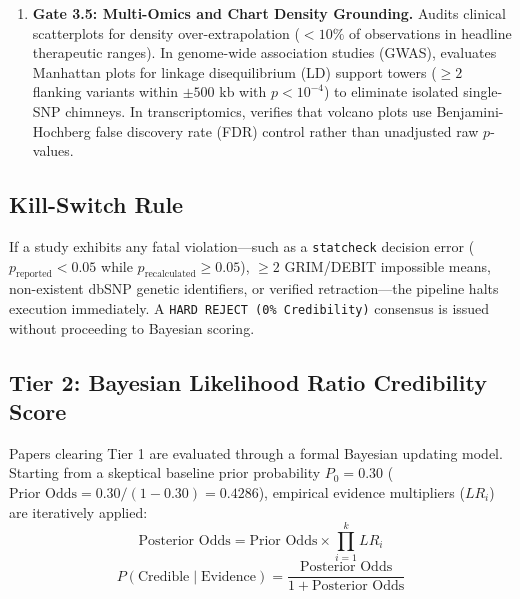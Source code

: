 \documentclass[11pt,a4paper]{article}
\begin{document}
\begin{enumerate}
    \item \textbf{Gate 3.5: Multi-Omics and Chart Density Grounding.}
    Audits clinical scatterplots for density over-extrapolation ($<10\%$ of observations in headline therapeutic ranges). In genome-wide association studies (GWAS), evaluates Manhattan plots for linkage disequilibrium (LD) support towers ($\ge 2$ flanking variants within $\pm 500$ kb with $p < 10^{-4}$) to eliminate isolated single-SNP chimneys. In transcriptomics, verifies that volcano plots use Benjamini-Hochberg false discovery rate (FDR) control rather than unadjusted raw $p$-values.
\end{enumerate}

\subsection{Kill-Switch Rule}
If a study exhibits any fatal violation—such as a \texttt{statcheck} decision error ($p_{\text{reported}} < 0.05$ while $p_{\text{recalculated}} \ge 0.05$), $\ge 2$ GRIM/DEBIT impossible means, non-existent dbSNP genetic identifiers, or verified retraction—the pipeline halts execution immediately. A \texttt{HARD REJECT (0\% Credibility)} consensus is issued without proceeding to Bayesian scoring.

\subsection{Tier 2: Bayesian Likelihood Ratio Credibility Score}
Papers clearing Tier 1 are evaluated through a formal Bayesian updating model. Starting from a skeptical baseline prior probability $P_0 = 0.30$ ($\text{Prior Odds} = 0.30 / (1 - 0.30) = 0.4286$), empirical evidence multipliers ($LR_i$) are iteratively applied:
\begin{equation}
    \text{Posterior Odds} = \text{Prior Odds} \times \prod_{i=1}^{k} LR_i
\end{equation}
\begin{equation}
    P(\text{Credible} \mid \text{Evidence}) = \frac{\text{Posterior Odds}}{1 + \text{Posterior Odds}}
\end{equation}
\end{document}
